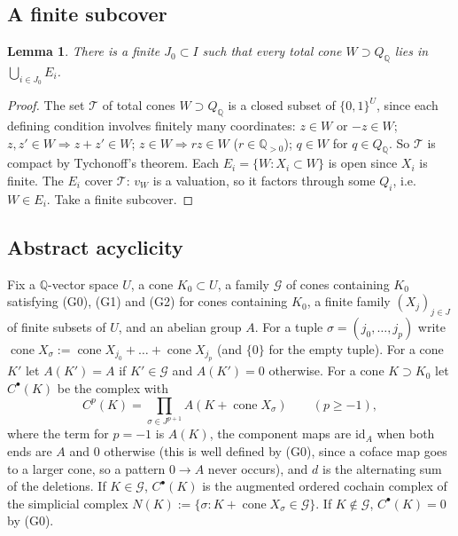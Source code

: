 \documentclass[11pt]{article}
\newtheorem{lemma}[theorem]{Lemma}
\theoremstyle{definition}
\theoremstyle{remark}
\newcommand{\QQ}{\mathbb{Q}}
\newcommand{\cone}{\operatorname{cone}}
\newcommand{\cG}{\mathcal{G}}
\newcommand{\cT}{\mathcal{T}}
\newcommand{\Qrat}{Q_{\QQ}}
\begin{document}
\subsection{A finite subcover}
\begin{lemma}\label{lem:3}
There is a finite $J_0\subset I$ such that every total cone $W\supset\Qrat$ lies in $\bigcup_{i\in J_0}E_i$.
\end{lemma}
\begin{proof}
The set $\cT$ of total cones $W\supset\Qrat$ is a closed subset of $\{0,1\}^U$, since each defining condition involves finitely many coordinates: $z\in W$ or $-z\in W$; $z,z'\in W\Rightarrow z+z'\in W$; $z\in W\Rightarrow rz\in W$ ($r\in\QQ_{>0}$); $q\in W$ for $q\in\Qrat$. So $\cT$ is compact by Tychonoff's theorem. Each $E_i=\{W: X_i\subset W\}$ is open since $X_i$ is finite. The $E_i$ cover $\cT$: $v_W$ is a valuation, so it factors through some $Q_i$, i.e.\ $W\in E_i$. Take a finite subcover.
\end{proof}

\subsection{Abstract acyclicity}
Fix a $\QQ$-vector space $U$, a cone $K_0\subset U$, a family $\cG$ of cones containing $K_0$ satisfying (G0), (G1) and (G2) for cones containing $K_0$, a finite family $(X_j)_{j\in J}$ of finite subsets of $U$, and an abelian group $A$. For a tuple $\sigma=(j_0,\dots,j_p)$ write $\cone X_\sigma:=\cone X_{j_0}+\dots+\cone X_{j_p}$ (and $\{0\}$ for the empty tuple). For a cone $K'$ let $A(K')=A$ if $K'\in\cG$ and $A(K')=0$ otherwise. For a cone $K\supset K_0$ let $C^\bullet(K)$ be the complex with
\[
C^p(K)=\prod_{\sigma\in J^{p+1}}A(K+\cone X_\sigma)\qquad(p\ge-1),
\]
where the term for $p=-1$ is $A(K)$, the component maps are $\mathrm{id}_A$ when both ends are $A$ and $0$ otherwise (this is well defined by (G0), since a coface map goes to a larger cone, so a pattern $0\to A$ never occurs), and $d$ is the alternating sum of the deletions. If $K\in\cG$, $C^\bullet(K)$ is the augmented ordered cochain complex of the simplicial complex $N(K):=\{\sigma:K+\cone X_\sigma\in\cG\}$. If $K\notin\cG$, $C^\bullet(K)=0$ by (G0).
\end{document}
